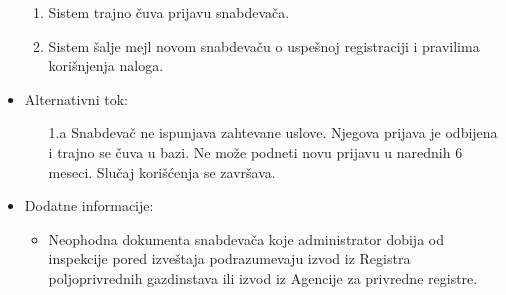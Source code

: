 \begin{itemize}
\begin{enumerate}
		    \item Sistem trajno čuva prijavu snabdevača.
		    \item Sistem šalje mejl novom snabdevaču o uspešnoj registraciji i pravilima korišnjenja naloga.
		\end{enumerate}
	\item Alternativni tok:
		\begin{itemize}
			 \item[1.a] Snabdevač ne ispunjava zahtevane uslove. Njegova prijava je odbijena i trajno se čuva u bazi. Ne može podneti novu prijavu u narednih 6 meseci. Slučaj korišćenja se završava.
	
		\end{itemize}
	\item Dodatne informacije:
		\begin{itemize}
			\item Neophodna dokumenta snabdevača koje administrator dobija od inspekcije pored izveštaja podrazumevaju izvod iz Registra poljoprivrednih gazdinstava ili izvod iz Agencije za privredne registre.
		\end{itemize}						
\end{itemize}